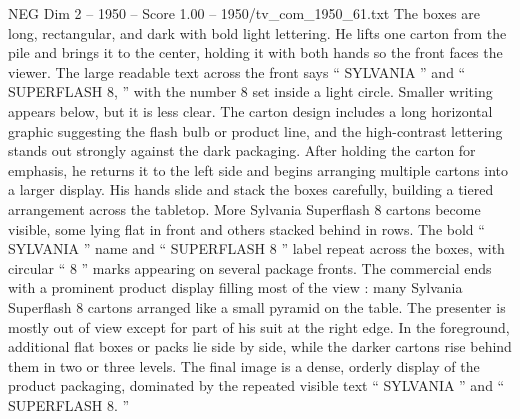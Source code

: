 \begin{textsample}{NEG Dim 2 – 1950 – Score 1.00 – 1950/tv\_com\_1950\_61.txt}
The boxes are long, rectangular, and dark with bold light lettering.
He lifts one carton from the pile and brings it to the center, holding it with both hands so the front faces the viewer.
The large readable text across the front says “ SYLVANIA ” and “ SUPERFLASH 8, ” with the number 8 set inside a light circle.
Smaller writing appears below, but it is less clear.
The carton design includes a long horizontal graphic suggesting the flash bulb or product line, and the high-contrast lettering stands out strongly against the dark packaging.
After holding the carton for emphasis, he returns it to the left side and begins arranging multiple cartons into a larger display.
His hands slide and stack the boxes carefully, building a tiered arrangement across the tabletop.
More Sylvania Superflash 8 cartons become visible, some lying flat in front and others stacked behind in rows.
The bold “ SYLVANIA ” name and “ SUPERFLASH 8 ” label repeat across the boxes, with circular “ 8 ” marks appearing on several package fronts.
The commercial ends with a prominent product display filling most of the view : many Sylvania Superflash 8 cartons arranged like a small pyramid on the table.
The presenter is mostly out of view except for part of his suit at the right edge.
In the foreground, additional flat boxes or packs lie side by side, while the darker cartons rise behind them in two or three levels.
The final image is a dense, orderly display of the product packaging, dominated by the repeated visible text “ SYLVANIA ” and “ SUPERFLASH 8. ”

\end{textsample}
